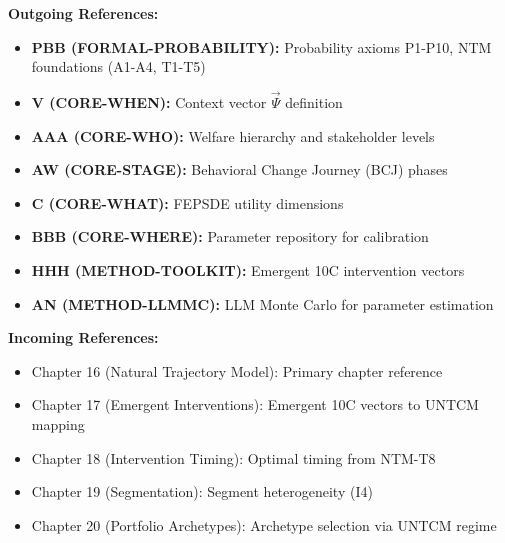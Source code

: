 \begin{tcolorbox}[colback=blue!5!white,colframe=blue!75!black,title=Cross-Reference Map]
\textbf{Outgoing References:}
\begin{itemize}
    \item \textbf{PBB (FORMAL-PROBABILITY):} Probability axioms P1-P10, NTM foundations (A1-A4, T1-T5)
    \item \textbf{V (CORE-WHEN):} Context vector $\vec{\Psi}$ definition
    \item \textbf{AAA (CORE-WHO):} Welfare hierarchy and stakeholder levels
    \item \textbf{AW (CORE-STAGE):} Behavioral Change Journey (BCJ) phases
    \item \textbf{C (CORE-WHAT):} FEPSDE utility dimensions
    \item \textbf{BBB (CORE-WHERE):} Parameter repository for calibration
    \item \textbf{HHH (METHOD-TOOLKIT):} Emergent 10C intervention vectors
    \item \textbf{AN (METHOD-LLMMC):} LLM Monte Carlo for parameter estimation
\end{itemize}

\textbf{Incoming References:}
\begin{itemize}
    \item Chapter 16 (Natural Trajectory Model): Primary chapter reference
    \item Chapter 17 (Emergent Interventions): Emergent 10C vectors to UNTCM mapping
    \item Chapter 18 (Intervention Timing): Optimal timing from NTM-T8
    \item Chapter 19 (Segmentation): Segment heterogeneity (I4)
    \item Chapter 20 (Portfolio Archetypes): Archetype selection via UNTCM regime
\end{itemize}
\end{tcolorbox}

